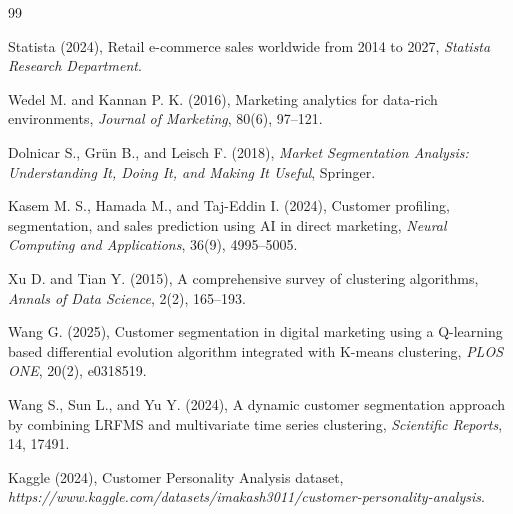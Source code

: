 \documentclass[twoside]{article}
\begin{document}
\begin{thebibliography}{99}

Statista (2024),
Retail e-commerce sales worldwide from 2014 to 2027,
{\it Statista Research Department}.

Wedel M. and Kannan P. K. (2016),
Marketing analytics for data-rich environments,
{\it Journal of Marketing}, 80(6), 97--121.



Dolnicar S., Grün B., and Leisch F. (2018),
{\it Market Segmentation Analysis: Understanding It, Doing It, and Making It Useful},
Springer.




Kasem M. S., Hamada M., and Taj-Eddin I. (2024),
Customer profiling, segmentation, and sales prediction using AI in direct marketing,
{\it Neural Computing and Applications}, 36(9), 4995--5005.

Xu D. and Tian Y. (2015),
A comprehensive survey of clustering algorithms,
{\it Annals of Data Science}, 2(2), 165--193.



Wang G. (2025),
Customer segmentation in digital marketing using a Q-learning based differential evolution algorithm integrated with K-means clustering,
{\it PLOS ONE}, 20(2), e0318519.

Wang S., Sun L., and Yu Y. (2024),
A dynamic customer segmentation approach by combining LRFMS and multivariate time series clustering,
{\it Scientific Reports}, 14, 17491.




Kaggle (2024),
Customer Personality Analysis dataset,
{\it https://www.kaggle.com/datasets/imakash3011/customer-personality-analysis}.


\end{thebibliography}

 
\end{document}
